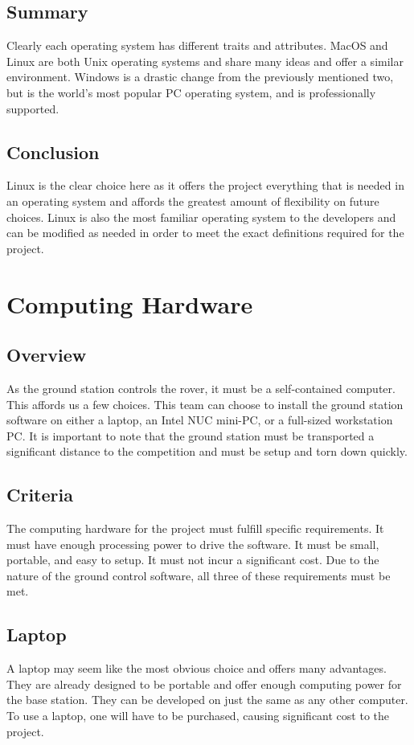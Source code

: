 \documentclass[onecolumn, draftclsnofoot, 10pt, compsoc]{IEEEtran}
\begin{document}
\subsection{Summary}
Clearly each operating system has different traits and attributes.
MacOS and Linux are both Unix operating systems and share many ideas and offer a similar environment.
Windows is a drastic change from the previously mentioned two, but is the world's most popular PC operating system, and is professionally supported.

\subsection{Conclusion}
Linux is the clear choice here as it offers the project everything that is needed in an operating system and affords the greatest amount of flexibility on future choices.
Linux is also the most familiar operating system to the developers and can be modified as needed in order to meet the exact definitions required for the project.

\section{Computing Hardware}
\subsection{Overview}
As the ground station controls the rover, it must be a self-contained computer.
This affords us a few choices.
This team can choose to install the ground station software on either a laptop, an Intel NUC mini-PC, or a full-sized workstation PC.
It is important to note that the ground station must be transported a significant distance to the competition and must be setup and torn down quickly.

\subsection{Criteria}
The computing hardware for the project must fulfill specific requirements.
It must have enough processing power to drive the software.
It must be small, portable, and easy to setup.
It must not incur a significant cost.
Due to the nature of the ground control software, all three of these requirements must be met.

\subsection{Laptop}
A laptop may seem like the most obvious choice and offers many advantages.
They are already designed to be portable and offer enough computing power for the base station.
They can be developed on just the same as any other computer.
To use a laptop, one will have to be purchased, causing significant cost to the project.
\end{document}
